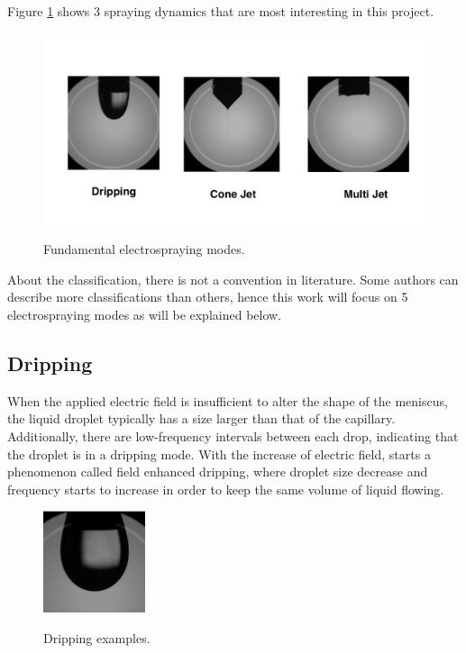Figure \ref{fig:spraying_modes} shows 3 spraying dynamics that are most interesting in this project. 


  \begin{figure}[H]
      \center
      \includegraphics[width=15cm]{Figuras/spraying_modes.png}
      \label{fig:spraying_modes}
      \caption{Fundamental electrospraying modes.}
  \end{figure}

About the classification, there is not a convention in literature. Some authors can describe more classifications than others, hence this work will focus on 5 electrospraying modes as will be explained below.

\subsection{Dripping}
\label{subsec:dripping}

When the applied electric field is insufficient to alter the shape of the meniscus, the liquid droplet typically has a size larger than that of the capillary. Additionally, there are low-frequency intervals between each drop, indicating that the droplet is in a dripping mode.
With the increase of electric field, starts a phenomenon called field enhanced dripping, where droplet size decrease and frequency starts to increase in order to keep the same volume of liquid flowing.

\begin{figure}[H]
  \center
  \includegraphics[width=3cm]{Figuras/19:03/drip_example.png}
  \label{fig:drip_example}
  \caption{Dripping examples.}
\end{figure}

